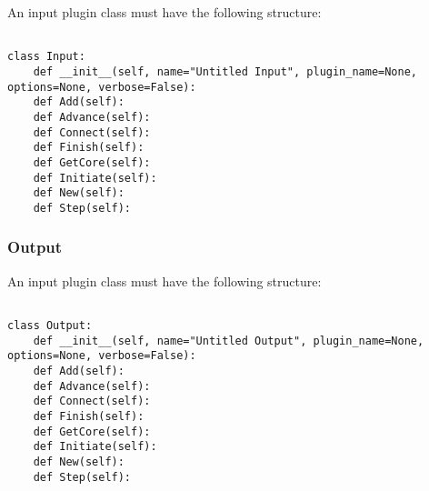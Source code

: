 \documentclass[12pt]{article}
\begin{document}
An input plugin class must have the following structure:

\begin{verbatim}

class Input:
    def __init__(self, name="Untitled Input", plugin_name=None, options=None, verbose=False):
    def Add(self):
    def Advance(self):
    def Connect(self):
    def Finish(self):
    def GetCore(self):
    def Initiate(self):
    def New(self):
    def Step(self):
\end{verbatim}


\subsubsection*{Output}

An input plugin class must have the following structure:

\begin{verbatim}

class Output:
    def __init__(self, name="Untitled Output", plugin_name=None, options=None, verbose=False):
    def Add(self):
    def Advance(self):
    def Connect(self):
    def Finish(self):
    def GetCore(self):
    def Initiate(self):
    def New(self):
    def Step(self):
\end{verbatim}




\subsection*{}
\end{document}
